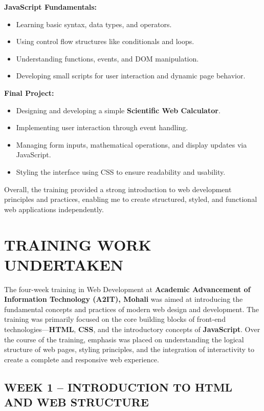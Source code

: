 \documentclass[a4paper,12pt,oneside]{report}
\numberwithin{equation}{chapter}
\numberwithin{figure}{chapter}
\numberwithin{table}{chapter}
\begin{document}
\textbf{JavaScript Fundamentals:}
\begin{itemize}
    \item Learning basic syntax, data types, and operators.
    \item Using control flow structures like conditionals and loops.
    \item Understanding functions, events, and DOM manipulation.
    \item Developing small scripts for user interaction and dynamic page behavior.
\end{itemize}

\textbf{Final Project:}
\begin{itemize}
    \item Designing and developing a simple \textbf{Scientific Web Calculator}.
    \item Implementing user interaction through event handling.
    \item Managing form inputs, mathematical operations, and display updates via JavaScript.
    \item Styling the interface using CSS to ensure readability and usability.
\end{itemize}

Overall, the training provided a strong introduction to web development principles and practices, enabling me to create structured, styled, and functional web applications independently.


\newpage
\chapter{TRAINING WORK UNDERTAKEN}

The four-week training in Web Development at \textbf{Academic Advancement of Information Technology (A2IT), Mohali} was aimed at introducing the fundamental concepts and practices of modern web design and development. The training was primarily focused on the core building blocks of front-end technologies—\textbf{HTML}, \textbf{CSS}, and the introductory concepts of \textbf{JavaScript}. Over the course of the training, emphasis was placed on understanding the logical structure of web pages, styling principles, and the integration of interactivity to create a complete and responsive web experience.

\vspace{5mm}
\noindent
\section{WEEK 1 – INTRODUCTION TO HTML AND WEB STRUCTURE}
\end{document}
